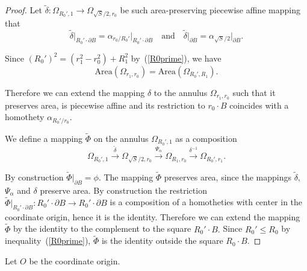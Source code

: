 \documentclass[12pt]{article}
\theoremstyle{definition}
\begin{document}
\begin{proof}
Let $\widetilde \delta: \Omega_{R_0', 1} \to \Omega_{\sqrt {S}/2, r_0}$ be such area-preserving piecewise affine mapping that
$$
\widetilde \delta\big|_{R_0'\cdot\partial B} = \alpha_{r_0/R_0'}\big|_{R_0'\cdot\partial B}
\quad\text{and}\quad
\widetilde \delta\big|_{\partial B} = \alpha_{\sqrt S/2}\big|_{\partial B}.
$$


Since $\left(R_0'\right)^2 = \left(r_1^2 -r_0^2\right) + R_1^2$ by~(\ref{R0prime}), we have
$$
\mathrm{Area}(\Omega_{r_1,r_0}) = \mathrm{Area}(\Omega_{R_0',R_1}).
$$

Therefore we can extend the mapping $\delta$ to the annulus $\Omega_{r_1,r_0}$ such that it preserves area, is piecewise affine and its restriction to $r_0\cdot B$ coincides with a homothety $\alpha_{R_0'/r_0}.$

We define a mapping $\widetilde\Phi$ on the annulus $\Omega_{R_0',1}$ as a composition
$$
\Omega_{R_0',1}
\xrightarrow{\widetilde\delta}
\Omega_{\sqrt {S}/2, r_0}
\xrightarrow{\Psi_{\alpha}}
\Omega_{R_1, r_0}
\xrightarrow{\delta^{-1}}
\Omega_{R_0',r_1}.
$$

By construction $\widetilde \Phi\big|_{\partial B} = \phi.$ The mapping $\widetilde\Phi$ preserves area, since the mappings $\widetilde\delta,$ $\Psi_{\alpha}$ and $\delta$ preserve area. By construction the restriction $\widetilde\Phi\big|_{R_0'\cdot\partial B}:R_0'\cdot\partial B\to R_0'\cdot\partial B$ is a composition of a homotheties with center in the coordinate origin, hence it is the identity. Therefore we can extend the mapping $\widetilde \Phi$ by the identity to the complement to the square $R_0'\cdot B.$ Since $R_0'\le R_0$ by inequality~(\ref{R0prime}), $\widetilde\Phi$ is the identity outside the square $R_0\cdot B.$
\end{proof}

Let $O$ be the coordinate origin.
\end{document}
